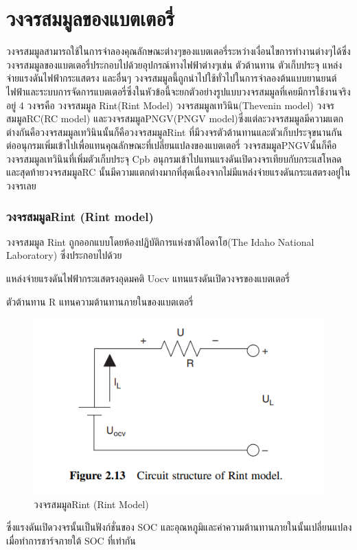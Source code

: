 \section{วงจรสมมูลของแบตเตอรี่}
	วงจรสมมูลสามารถใช้ในการจำลองคุณลักษณะต่างๆของแบตเตอรี่ระหว่างเงื่อนไขการทำงานต่างๆได้ซึ่งวงจรสมมูลของแบตเตอรี่ประกอบไปด้วยอุปกรณ์ทางไฟฟ้าต่างๆเช่น ตัวต้านทาน ตัวเก็บประจุ แหล่งจ่ายแรงดันไฟฟ้ากระแสตรง และอื่นๆ วงจรสมมูลนี้ถูกนำไปใช้ทั่วไปในการจำลองต้นแบบยานยนต์ไฟฟ้าและระบบการจัดการแบตเตอรี่ซึ่งในหัวข้อนี้จะยกตัวอย่างรูปแบบวงจรสมมูลที่เคยมีการใช้งานจริงอยู่ 4 วงจรคือ วงจรสมมูล Rint(Rint Model) วงจรสมมูลเทวินิน(Thevenin model) วงจรสมมูลRC(RC model) และวงจรสมมูลPNGV(PNGV model)ซึ่งแต่ละวงจรสมมูลมีความแตกต่างกันคือวงจรสมมูลเทวินินนั้นก็คือวงจรสมมูลRint ที่มีวงจรตัวต้านทานและตัวเก็บประจุขนานกันต่ออนุกรมเพิ่มเข้าไปเพื่อแทนคุณลักษณะที่เปลี่ยนแปลงของแบตเตอรี่ วงจรสมมูลPNGVนั้นก็คือวงจรสมมูลเทวินินที่เพิ่มตัวเก็บประจุ Cpb อนุกรมเข้าไปแทนแรงดันเปิดวงจรเทียบกับกระแสโหลด และสุดท้ายวงจรสมมูลRC นั้นมีความแตกต่างมากที่สุดเนื่องจากไม่มีแหล่งจ่ายแรงดันกระแสตรงอยู่ในวงจรเลย\newline
\subsubsection*{วงจรสมมูลRint (Rint model)}
วงจรสมมูล Rint ถูกออกแบบโดยห้องปฏิบัติการแห่งชาติไอดาโฮ(The Idaho National Laboratory) ซึ่งประกอบไปด้วย
\begin{itemize}
{\item แหล่งจ่ายแรงดันไฟฟ้ากระแสตรงอุดมคติ Uocv แทนแรงดันเปิดวงจรของแบตเตอรี่}
{\item ตัวต้านทาน R แทนความต้านทานภายในของแบตเตอรี่}
\end{itemize}
\begin{center}
	\begin{figure}[!h]
		\includegraphics[width=0.6\linewidth]{Chapters/img/Rint_model.png}
			\centering
			\captionsetup{justification=centering,margin=2cm}
			\caption{วงจรสมมูลRint (Rint Model)}
	\end{figure}
\end{center}
ซึ่งแรงดันเปิดวงจรนั้นเป็นฟังก์ชั่นของ SOC และอุณหภูมิและค่าความต้านทานภายในนั้นเปลี่ยนแปลงเมื่อทำการชาร์จภายใต้ SOC ที่เท่ากัน\newline
